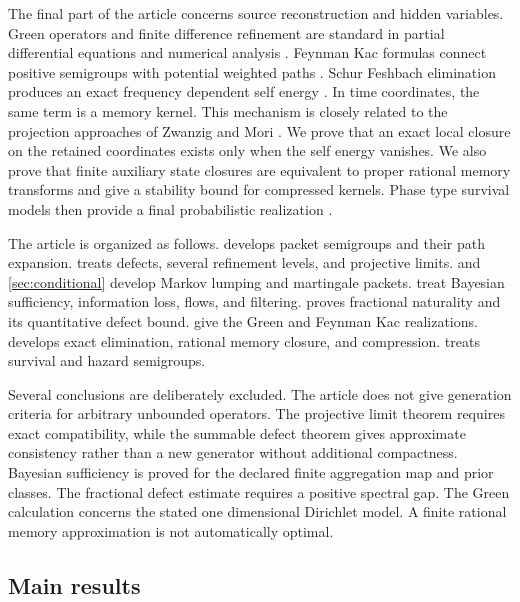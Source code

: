 \documentclass{aomart}
\theoremstyle{definition}
\theoremstyle{remark}
\begin{document}
The final part of the article concerns source reconstruction and hidden variables. Green operators and finite difference refinement are standard in partial differential equations and numerical analysis \cite{Evans2010,LeVeque2007}. Feynman Kac formulas connect positive semigroups with potential weighted paths \cite{Kac1949}. Schur Feshbach elimination produces an exact frequency dependent self energy \cite{Feshbach1958}. In time coordinates, the same term is a memory kernel. This mechanism is closely related to the projection approaches of Zwanzig and Mori \cite{Zwanzig1961,Mori1965,ChorinHaldKupferman2000}. We prove that an exact local closure on the retained coordinates exists only when the self energy vanishes. We also prove that finite auxiliary state closures are equivalent to proper rational memory transforms and give a stability bound for compressed kernels. Phase type survival models then provide a final probabilistic realization \cite{Neuts1981}.

The article is organized as follows.  develops packet semigroups and their path expansion.  treats defects, several refinement levels, and projective limits.  and \cref{sec:conditional} develop Markov lumping and martingale packets.  treat Bayesian sufficiency, information loss, flows, and filtering.  proves fractional naturality and its quantitative defect bound.  give the Green and Feynman Kac realizations.  develops exact elimination, rational memory closure, and compression.  treats survival and hazard semigroups.

Several conclusions are deliberately excluded. The article does not give generation criteria for arbitrary unbounded operators. The projective limit theorem requires exact compatibility, while the summable defect theorem gives approximate consistency rather than a new generator without additional compactness. Bayesian sufficiency is proved for the declared finite aggregation map and prior classes. The fractional defect estimate requires a positive spectral gap. The Green calculation concerns the stated one dimensional Dirichlet model. A finite rational memory approximation is not automatically optimal.

\subsection{Main results}\label{sec:main_results}
\end{document}

